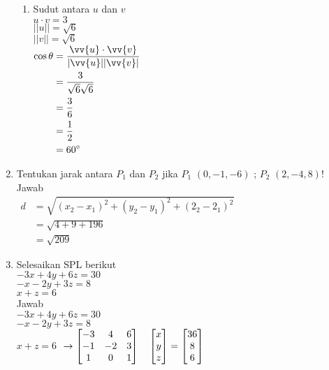 \documentclass[a4paper,12pt]{article}
\begin{document}
\begin{enumerate}
\begin{enumerate}[label=(\alph*)]
        \item Sudut antara $u$ dan $v$\\
        $u \cdot v = 3$ \\
        $||u|| = \sqrt{6}$ \\
        $||v|| = \sqrt{6}$ \\
        $
        \begin{aligned}
           \cos \theta
           &= \frac{\vv{u} \cdot \vv{v}}{|\vv{u}| |\vv{v}|} \\
           &= \frac{3}{\sqrt{6} \sqrt{6}} \\
           &= \frac{3}{6} \\
           &= \frac{1}{2} \\
           &= \ang{60} 
        \end{aligned}
        $\\[4ex]
      \end{enumerate}

      \item Tentukan jarak antara $P_{1}$ dan $P_{2}$ jika $P_{1}$ $(0, -1, -6)$ ; $P_{2}$ $(2, -4, 8)$! \\
      Jawab \\
          $
          \begin{aligned}
             d
             &= \sqrt{(x_{2} - x_{1})^{2} + (y_{2} - y_{1})^{2} + (2_{2} - 2_{1})^{2}} \\
             &= \sqrt{4 + 9 + 196} \\
             &= \sqrt{209}
          \end{aligned}
          $\\[4ex]

     \item Selesaikan SPL berikut \\
     $-3x + 4y + 6z = 30$ \\
     $-x - 2y + 3z = 8$ \\
     $x + z = 6$\\[4ex]

     Jawab \\
     $-3x + 4y + 6z = 30$ \\
     $-x - 2y + 3z = 8$ \\
     $x + z = 6$
     $\\
     \rightarrow \begin{bmatrix}
        -3 & 4 & 6 \\
        -1 & -2 & 3 \\
        1 & 0 & 1
     \end{bmatrix}
     \quad
     \begin{bmatrix}
        x \\
        y \\
        z \\
     \end{bmatrix}
     =\begin{bmatrix}
        36 \\
        8 \\
        6
     \end{bmatrix}
     $


\end{enumerate}
\end{document}
